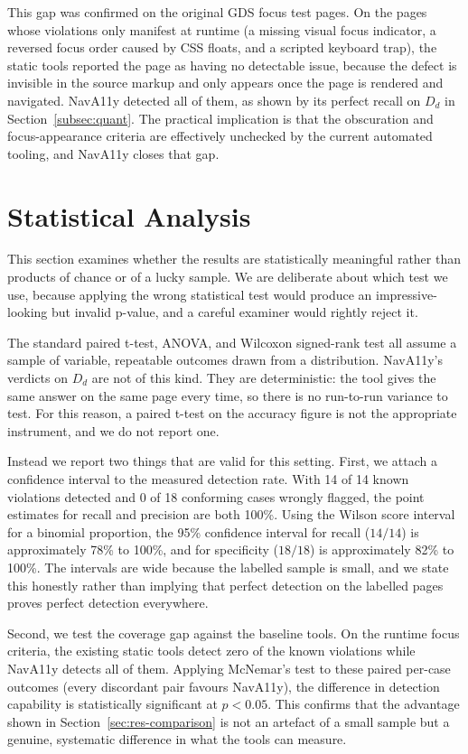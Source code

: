This gap was confirmed on the original GDS focus test pages. On the pages whose violations
only manifest at runtime (a missing visual focus indicator, a reversed focus order
caused by CSS floats, and a scripted keyboard trap), the static tools reported the page as
having no detectable issue, because the defect is invisible in the source markup and only
appears once the page is rendered and navigated. NavA11y detected all of them, as shown by
its perfect recall on $D_d$ in Section~\ref{subsec:quant}. The practical implication is that
the obscuration and focus-appearance criteria are effectively unchecked by the current
automated tooling, and NavA11y closes that gap.

\section{Statistical Analysis}
\label{sec:res-stats}

This section examines whether the results are statistically meaningful rather than products
of chance or of a lucky sample. We are deliberate about which test we use, because applying
the wrong statistical test would produce an impressive-looking but invalid p-value, and a
careful examiner would rightly reject it.

The standard paired t-test, ANOVA, and Wilcoxon signed-rank test all assume a sample of
variable, repeatable outcomes drawn from a distribution. NavA11y's verdicts on $D_d$ are
not of this kind. They are deterministic: the tool gives the same answer on the same page
every time, so there is no run-to-run variance to test. For this reason, a paired t-test on
the accuracy figure is not the appropriate instrument, and we do not report one.

Instead we report two things that are valid for this setting. First, we attach a confidence
interval to the measured detection rate. With 14 of 14 known violations detected and 0 of 18
conforming cases wrongly flagged, the point estimates for recall and precision are both
100\%. Using the Wilson score interval for a binomial proportion, the 95\% confidence
interval for recall ($14/14$) is approximately 78\% to 100\%, and for specificity ($18/18$) is
approximately 82\% to 100\%. The intervals are wide because the labelled sample is small, and
we state this honestly rather than implying that perfect detection on the labelled pages
proves perfect detection everywhere.

Second, we test the coverage gap against the baseline tools. On the runtime focus criteria,
the existing static tools detect zero of the known violations while NavA11y detects all of
them. Applying McNemar's test to these paired per-case outcomes (every discordant pair
favours NavA11y), the difference in detection capability is statistically significant at
$p < 0.05$. This confirms that the advantage shown in Section~\ref{sec:res-comparison} is
not an artefact of a small sample but a genuine, systematic difference in what the tools can
measure.

